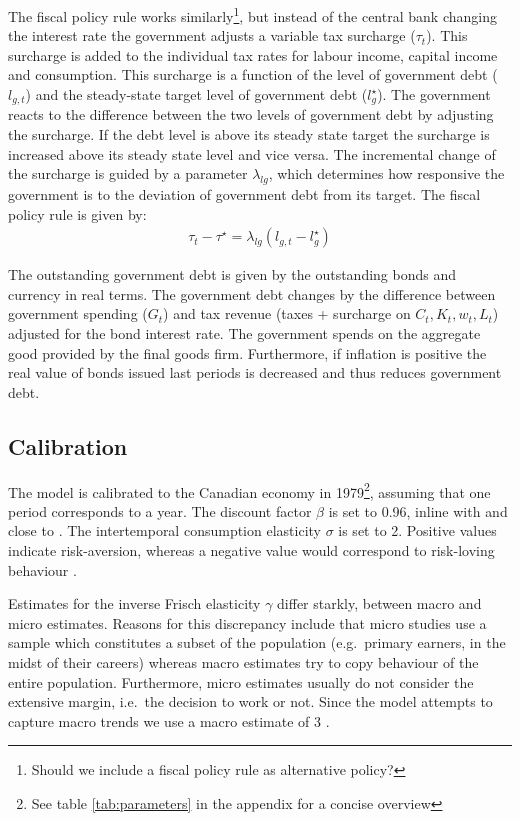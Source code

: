 \documentclass[12pt]{article}
\begin{document}
The fiscal policy rule works similarly\footnote{Should we include a fiscal policy rule as alternative policy?}, but instead of the central bank changing the interest rate the government adjusts a variable tax surcharge ($\tau_t$). This surcharge is added to the individual tax rates for labour income, capital income and consumption. This surcharge is a function of the level of government debt ($l_{g,t}$) and the steady-state target level of government debt ($l^{\star}_{g}$). The government reacts to the difference between the two levels of government debt by adjusting the surcharge. If the debt level is above its steady state target the surcharge is increased above its steady state level and vice versa. The incremental change of the surcharge is guided by a parameter $\lambda_{l g}$, which determines how responsive the government is to the deviation of government debt from its target. The fiscal policy rule is given by:
\begin{align}
    \tau_t - \tau^{\star} = \lambda_{l g} (l_{g,t} - l^{\star}_{g})
\end{align}

The outstanding government debt is given by the outstanding bonds and currency in real terms. The government debt changes by the difference between government spending ($G_t$) and tax revenue (taxes + surcharge on $C_t, K_t, w_t,L_t$) adjusted for the bond interest rate. The government spends on the aggregate good provided by the final goods firm. Furthermore, if inflation is positive the real value of bonds issued last periods is decreased and thus reduces government debt.


\subsection*{Calibration}
The model is calibrated to the Canadian economy in 1979\footnote{See table \ref{tab:parameters} in the appendix for a concise overview}, assuming that one period corresponds to a year. 
The discount factor $\beta$ is set to 0.96, inline with \textcite{someOilDemandSupply2023} and close to \textcite{corriganToTEMIIIBank2021}. 
The intertemporal consumption elasticity $\sigma$ is set to 2. Positive values indicate risk-aversion, whereas a negative value would correspond to risk-loving behaviour
\parencite{thimmeIntertemporalSubstitutionConsumption2017}.

Estimates for the inverse Frisch elasticity $\gamma$ differ starkly, between macro and micro estimates. Reasons for this discrepancy
include that micro studies use a sample which constitutes a subset of the population (e.g.\ primary earners, in the midst of their careers) whereas macro 
estimates try to copy behaviour of the entire population. Furthermore, micro estimates usually do not consider the extensive margin, i.e.\ the decision 
to work or not. Since the model attempts to capture macro trends we use a macro estimate of 3 \parencite{petermanReconcilingMicroMacro2016}. 
\end{document}
